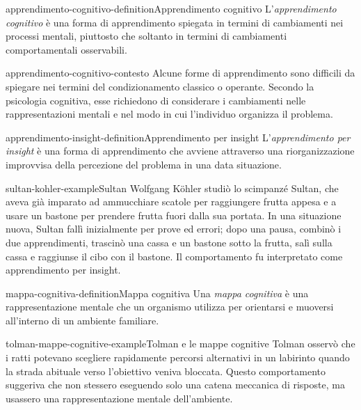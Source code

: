 \documentclass[preview]{standalone}
\begin{document}
\begin{snippetdefinition}{apprendimento-cognitivo-definition}{Apprendimento cognitivo}
    L'\emph{apprendimento cognitivo} è una forma di apprendimento spiegata in
    termini di cambiamenti nei processi mentali, piuttosto che soltanto in
    termini di cambiamenti comportamentali osservabili.
\end{snippetdefinition}

\begin{snippet}{apprendimento-cognitivo-contesto}
    Alcune forme di apprendimento sono difficili da spiegare nei termini del
    condizionamento classico o operante. Secondo la psicologia cognitiva, esse
    richiedono di considerare i cambiamenti nelle rappresentazioni mentali e nel
    modo in cui l'individuo organizza il problema.
\end{snippet}

\begin{snippetdefinition}{apprendimento-insight-definition}{Apprendimento per insight}
    L'\emph{apprendimento per insight} è una forma di apprendimento che avviene
    attraverso una riorganizzazione improvvisa della percezione del problema in
    una data situazione.
\end{snippetdefinition}

\begin{snippetexample}{sultan-kohler-example}{Sultan}
    Wolfgang Köhler studiò lo scimpanzé Sultan, che aveva già imparato ad
    ammucchiare scatole per raggiungere frutta appesa e a usare un bastone per
    prendere frutta fuori dalla sua portata. In una situazione nuova, Sultan
    fallì inizialmente per prove ed errori; dopo una pausa, combinò i due
    apprendimenti, trascinò una cassa e un bastone sotto la frutta, salì sulla
    cassa e raggiunse il cibo con il bastone. Il comportamento fu interpretato
    come apprendimento per insight.
\end{snippetexample}


\begin{snippetdefinition}{mappa-cognitiva-definition}{Mappa cognitiva}
    Una \emph{mappa cognitiva} è una rappresentazione mentale che un organismo
    utilizza per orientarsi e muoversi all'interno di un ambiente familiare.
\end{snippetdefinition}

\begin{snippetexample}{tolman-mappe-cognitive-example}{Tolman e le mappe cognitive}
    Tolman osservò che i ratti potevano scegliere rapidamente percorsi
    alternativi in un labirinto quando la strada abituale verso l'obiettivo
    veniva bloccata. Questo comportamento suggeriva che non stessero eseguendo
    solo una catena meccanica di risposte, ma usassero una rappresentazione
    mentale dell'ambiente.
\end{snippetexample}
\end{document}
